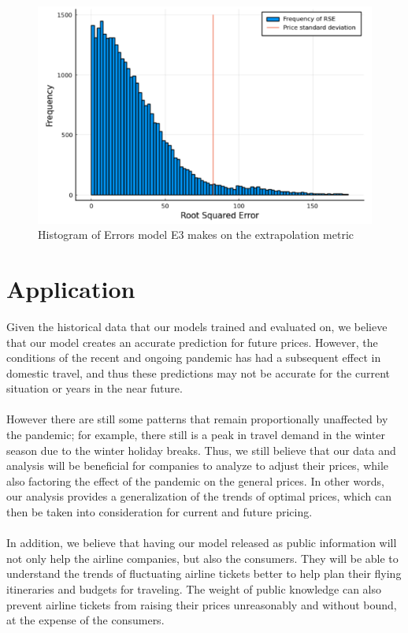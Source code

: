 \documentclass{article}
\begin{document}
\begin{figure}[h]
\centering
\includegraphics[scale=.40]{images/E3_Eerrors.png}
\caption{Histogram of Errors model E3 makes on the extrapolation metric}
\end{figure}

\section{Application}
Given the historical data that our models trained and evaluated on, we believe that our model creates an accurate prediction for future prices. However, the conditions of the recent and ongoing pandemic has had a subsequent effect in domestic travel, and thus these predictions may not be accurate for the current situation or years in the near future.\\\\
However there are still some patterns that remain proportionally unaffected by the pandemic; for example, there still is a peak in travel demand in the winter season due to the winter holiday breaks. Thus, we still believe that our data and analysis will be beneficial for companies to analyze to adjust their prices, while also factoring the effect of the pandemic on the general prices. In other words, our analysis provides a generalization of the trends of optimal prices, which can then be taken into consideration for current and future pricing.\\\\
In addition, we believe that having our model released as public information will not only help the airline companies, but also the consumers. They will be able to understand the trends of fluctuating airline tickets better to help plan their flying itineraries and budgets for traveling. The weight of public knowledge can also prevent airline tickets from raising their prices unreasonably and without bound, at the expense of the consumers.
\end{document}
